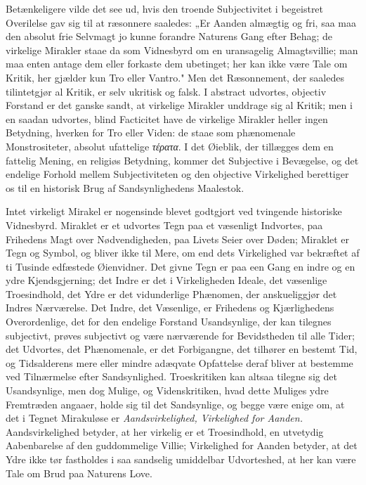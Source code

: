\documentclass[12pt]{article}
\newcommand{\opage}[1]{\marginnote{\footnotesize\textit{[#1]}}}
\begin{document}
Betænkeligere vilde det see ud, hvis den troende Subjectivitet i
begeistret Overilelse gav sig til at ræsonnere saaledes: „Er Aanden
almægtig og fri, saa maa den absolut frie Selvmagt jo kunne forandre
Naturens Gang efter Behag; de virkelige Mirakler staae da som
Vidnesbyrd om en uransagelig Almagtsvillie; man maa enten antage dem
eller forkaste dem ubetinget; her kan ikke være Tale om Kritik, her
gjælder kun Tro eller Vantro." Men det Ræsonnement, der saaledes
tilintetgjør al Kritik, er selv ukritisk og falsk. I abstract udvortes,
objectiv Forstand er det ganske sandt, at virkelige Mirakler unddrage
sig al Kritik; men i en saadan udvortes, blind Facticitet have de
virkelige Mirakler heller ingen Betydning, hverken for Tro eller Viden:
de staae som phænomenale Monstrositeter, absolut ufattelige
\textit{τέρατα}. I det Øieblik, der tillægges dem en fattelig Mening,
en religiøs Betydning, kommer det Subjective i Bevægelse, og det
endelige Forhold mellem Subjectiviteten og den objective Virkelighed
berettiger os til en historisk Brug af Sandsynlighedens Maalestok.

Intet virkeligt Mirakel er nogensinde blevet godtgjort ved tvingende
historiske Vidnesbyrd. Miraklet er et udvortes Tegn paa et væsenligt
Indvortes, paa Frihedens Magt over Nødvendigheden, paa Livets Seier
over Døden; Miraklet er Tegn og Symbol, og bliver ikke til Mere, om end
dets Virkelighed var bekræftet af ti Tusinde edfæstede Øienvidner. Det
givne Tegn er paa een Gang en indre og en ydre Kjendsgjerning; det
Indre er det i Virkeligheden Ideale, det væsenlige Troesindhold, det
Ydre er det vidunderlige Phænomen, der anskueliggjør det Indres
Nærværelse. Det Indre, det Væsenlige, er Frihedens og Kjærlighedens
Overordenlige, det for den endelige Forstand Usandsynlige, der kan
tilegnes subjectivt, prøves subjectivt og
\opage{75} være nærværende for Bevidstheden til alle Tider; det Udvortes, det
Phænomenale, er det Forbigangne, det tilhører en bestemt Tid, og
Tidsalderens mere eller mindre adæqvate Opfattelse deraf bliver at
bestemme ved Tilnærmelse efter Sandsynlighed. Troeskritiken kan altsaa
tilegne sig det Usandsynlige, men dog Mulige, og Videnskritiken, hvad
dette Muliges ydre Fremtræden angaaer, holde sig til det Sandsynlige,
og begge være enige om, at det i Tegnet Mirakuløse er
\emph{Aandsvirkelighed, Virkelighed for Aanden.} Aandsvirkelighed
betyder, at her virkelig er et Troesindhold, en utvetydig Aabenbarelse
af den guddommelige Villie; Virkelighed for Aanden betyder, at det Ydre
ikke tør fastholdes i saa sandselig umiddelbar Udvorteshed, at her kan
være Tale om Brud paa Naturens Love.
\end{document}
